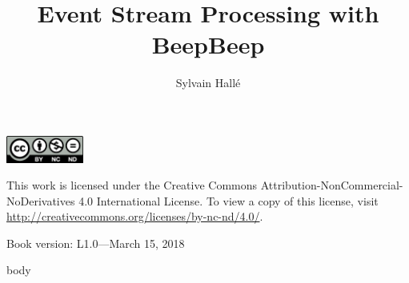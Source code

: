 \documentclass{lifmanual}
\title{Event Stream Processing with BeepBeep}
\author{Sylvain Hallé}
\begin{document}
\frontmatter

\newpage

\cleardoublepage

\newpage

\thispagestyle{empty}
\pagestyle{empty}
\rule{0in}{6in}
\noindent
\includegraphics[width=1in]{by-nc-nd}\\
{\sf\small
\noindent
This work is licensed under the Creative Commons Attribution-NonCommercial-NoDerivatives 4.0 International License. To view a copy of this license, visit \url{http://creativecommons.org/licenses/by-nc-nd/4.0/}.\\

\noindent
\rule{0in}{8pt}
\noindent
Book version: L1.0---March 15, 2018}


\tableofcontents
\newpage

\mainmatter
\thispagestyle{fancy}
\pagestyle{fancy}




{body}

\printindex
\end{document}
